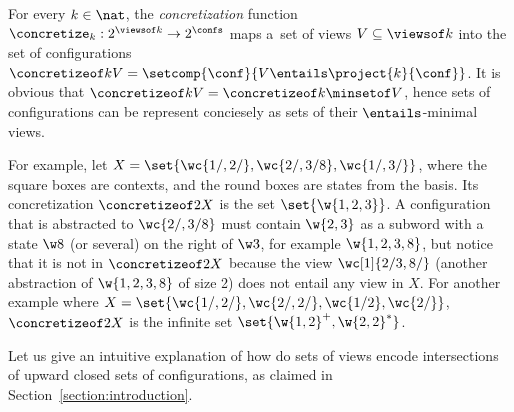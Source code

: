 For every $k\in \nat$, the {\it concretization} function
$\concretize_k: 2^{\viewsof k}\rightarrow2^\confs$ maps a~set of views
$V\subseteq\viewsof k$ into the set of configurations 
%
$\concretizeof k V = \setcomp{\conf}{V\entails\project{k}{\conf}}$.
%
%
It is obvious that $\concretizeof k V = \concretizeof k {\minsetof V}$, hence
sets of configurations can be represent conciesely as sets of their
$\entails$-minimal views. 

For example, let $X = \set{\wc{1/ ,2/ },\wc{2/ ,3/8},\wc{1/ ,3/ }}$, %
where the square boxes are contexts, and the round boxes are states
from the basis. Its concretization $\concretizeof 2 X$ is the set
$\set{\w{1,2,3}}$. %
A configuration that is abstracted to $\wc{2/ ,3/8}$ must contain
$\w{2,3}$ as a subword with a state $\w 8$ (or several)
on the right of $\w 3$, for example $\w{1,2,3,8}$, but
notice that it is not in $\concretizeof 2 X$ because the view
$\wc[1]{2/3,8/ }$ (another abstraction of $\w{1,2,3,8}$ of size
2) does not entail any view in $X$. %
%
For another example where $X = \set{%
  \wc{1/ ,2/ },%
  \wc{2/ ,2/ },%
  \wc{1/2},%
  \wc{2/ }%
}$, %
$\concretizeof 2 X$ is the infinite set
$\set{\w{1,2}^{+}, \w{2,2}^{*}}$.

Let us give an intuitive explanation of how do sets of views encode intersections of upward closed sets of configurations, as claimed in Section~\ref{section:introduction}. 

